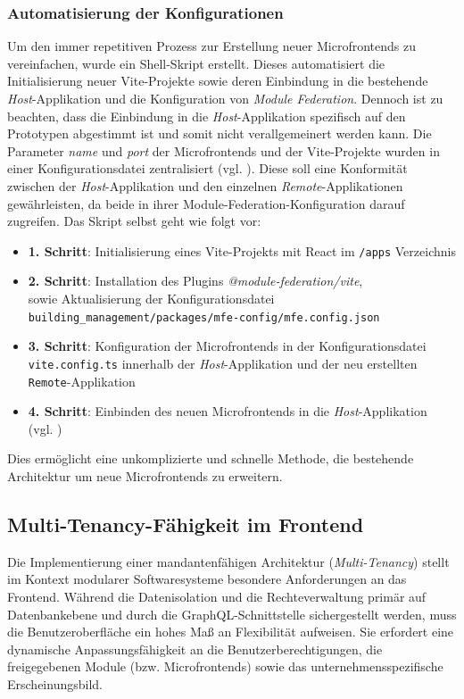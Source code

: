 \subsubsection{Automatisierung der Konfigurationen}
Um den immer repetitiven Prozess zur Erstellung neuer Microfrontends zu vereinfachen, wurde ein Shell-Skript erstellt. Dieses automatisiert die Initialisierung neuer Vite-Projekte sowie deren Einbindung in die bestehende \textit{Host}-Applikation und die Konfiguration von \textit{Module Federation}. Dennoch ist zu beachten, dass die Einbindung in die \textit{Host}-Applikation spezifisch auf den Prototypen abgestimmt ist und somit nicht verallgemeinert werden kann. Die Parameter \textit{name} und \textit{port} der Microfrontends und der Vite-Projekte wurden in einer Konfigurationsdatei zentralisiert (vgl. \cite[\texttt{building\_management/packages/mfe-config/mfe.config.json}]{eigener_code_usb}). Diese soll eine Konformität zwischen der \textit{Host}-Applikation und den einzelnen \textit{Remote}-Applikationen gewährleisten, da beide in ihrer Module-Federation-Konfiguration darauf zugreifen. Das Skript selbst geht wie folgt vor:
\begin{itemize}
  \item \textbf{1. Schritt}: Initialisierung eines Vite-Projekts mit React im \texttt{/apps} Verzeichnis
  \item \textbf{2. Schritt}: Installation des Plugins \textit{@module-federation/vite},\\
        sowie Aktualisierung der Konfigurationsdatei \\
        \texttt{building\_management/packages/mfe-config/mfe.config.json}
  \item \textbf{3. Schritt}: Konfiguration der Microfrontends in der Konfigurationsdatei \\
        \texttt{vite.config.ts} innerhalb der \textit{Host}-Applikation und der neu erstellten \texttt{Remote}-Applikation
  \item \textbf{4. Schritt}: Einbinden des neuen Microfrontends in die \textit{Host}-Applikation \\
        (vgl. \cite[\texttt{building\_management/apps/main/src/App.tsx} und \\ \texttt{building\_management/apps/main/src/components/Sidebar.tsx}]{eigener_code_usb})
\end{itemize}
Dies ermöglicht eine unkomplizierte und schnelle Methode, die bestehende Architektur um neue Microfrontends zu erweitern.


\subsection{Multi-Tenancy-Fähigkeit im Frontend}
Die Implementierung einer mandantenfähigen Architektur (\textit{Multi-Tenancy}) stellt im Kontext modularer Softwaresysteme besondere Anforderungen an das Frontend. Während die Datenisolation und die Rechteverwaltung primär auf Datenbankebene und durch die GraphQL-Schnittstelle sichergestellt werden, muss die Benutzeroberfläche ein hohes Maß an Flexibilität aufweisen. Sie erfordert eine dynamische Anpassungsfähigkeit an die Benutzerberechtigungen, die freigegebenen Module (bzw. Microfrontends) sowie das unternehmensspezifische Erscheinungsbild.

